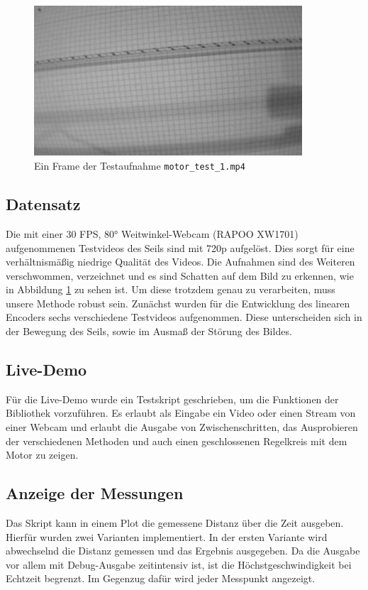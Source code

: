 \documentclass[10pt,a4paper]{scrarticle}
\begin{document}
	
\begin{figure}
  \includegraphics[width=10cm]{Abbildungen/image_frame.png}
  \centering
  \caption{Ein Frame der Testaufnahme \texttt{motor\_test\_1.mp4}
 }
  \label{fig:videoframe}
\end{figure}
	\subsection{Datensatz}
	Die mit einer 30 FPS, 80° Weitwinkel-Webcam (RAPOO XW1701) aufgenommenen Testvideos des Seils sind mit 720p aufgelöst. Dies sorgt für eine verhältnismäßig niedrige Qualität des Videos. Die Aufnahmen sind des Weiteren verschwommen, verzeichnet und es sind Schatten auf dem Bild zu erkennen, wie in Abbildung \ref{fig:videoframe} zu sehen ist.
	Um diese trotzdem genau zu verarbeiten, muss unsere Methode robust sein. Zunächst wurden für die Entwicklung des linearen Encoders sechs verschiedene Testvideos aufgenommen. Diese unterscheiden sich in der Bewegung des Seils, sowie im Ausmaß der Störung des Bildes.
	

	
	\subsection{Live-Demo}
	Für die Live-Demo wurde ein Testskript geschrieben, um die Funktionen der Bibliothek vorzuführen. Es erlaubt als Eingabe ein Video oder einen Stream von einer Webcam und erlaubt die Ausgabe von Zwischenschritten, das Ausprobieren der verschiedenen Methoden und auch einen geschlossenen Regelkreis mit dem Motor zu zeigen.
	
	\subsection{Anzeige der Messungen}
	Das Skript kann in einem Plot die gemessene Distanz über die Zeit ausgeben. Hierfür wurden zwei Varianten implementiert. In der ersten Variante wird abwechselnd die Distanz gemessen und das Ergebnis ausgegeben. Da die Ausgabe vor allem mit Debug-Ausgabe zeitintensiv ist, ist die Höchstgeschwindigkeit bei Echtzeit begrenzt. Im Gegenzug dafür wird jeder Messpunkt angezeigt.
	
\end{document}

